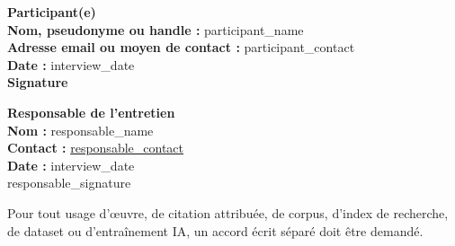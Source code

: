 \documentclass[10pt,a4paper]{article}
\newcommand{\fieldvalue}[2]{\textbf{#1}\hspace{0.4em}#2}
\newcommand{\fieldline}[1]{\textbf{#1}\hspace{0.4em}\hrulefill}
\newcommand{\smallnote}[1]{{\small\color{AestelierMuted}#1}}
\begin{document}
\noindent
\begin{minipage}[t]{0.47\linewidth}
  \textbf{Participant(e)}\\[1.1em]
  \fieldvalue{Nom, pseudonyme ou handle :}{ {{participant_name}} }\\[1.2em]
  \fieldvalue{Adresse email ou moyen de contact :}{ {{participant_contact}} }\\[1.2em]
  \fieldvalue{Date :}{ {{interview_date}} }\\[2.4em]
  \fieldline{Signature}
\end{minipage}%
\hfill
\begin{minipage}[t]{0.47\linewidth}
  \textbf{Responsable de l'entretien}\\[1.1em]
  \textbf{Nom :} {{responsable_name}}\\[1.2em]
  \textbf{Contact :} \href{mailto:{{responsable_contact}}}{ {{responsable_contact}} }\\[1.2em]
  \textbf{Date :} {{interview_date}}\\[1.5em]
  {{responsable_signature}}
\end{minipage}

\vspace{1.2em}

\smallnote{Pour tout usage d'œuvre, de citation attribuée, de corpus, d'index de recherche, de dataset ou d'entraînement IA, un accord écrit séparé doit être demandé.}
\end{document}
